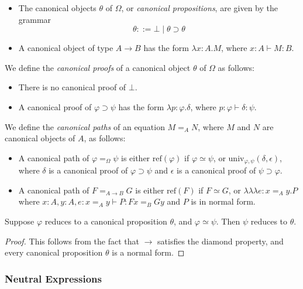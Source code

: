 \documentclass[a4paper,UKenglish]{lipics-v2016}
\newcommand*{\reff}[1]{\ensuremath{\mathrm{ref} \left( {#1} \right)}}
\newcommand*{\univ}[4]{\ensuremath{\mathrm{univ}_{{#1}, {#2}} \left({#3} , {#4} \right)}}
\newcommand*{\triplelambda}{\ensuremath{\lambda \!\! \lambda \!\! \lambda}}
\theoremstyle{plain}
\theoremstyle{definition}
\begin{document}
\begin{definition}
$ $
\begin{itemize}
\item
The canonical objects $\theta$ of $\Omega$, or \emph{canonical propositions}, are given by the grammar
\[ \theta ::= \bot \mid \theta \supset \theta \]
\item
A canonical object of type $A \rightarrow B$ has the form $\lambda x:A.M$, where
$x : A \vdash M : B$.
\end{itemize}
We define the \emph{canonical proofs} of a canonical object $\theta$ of $\Omega$ as follows:
\begin{itemize}
\item
There is no canonical proof of $\bot$.
\item
A canonical proof of $\varphi \supset \psi$ has the form $\lambda p : \varphi . \delta$, where $p : \varphi \vdash \delta : \psi$.
\end{itemize}
We define the \emph{canonical paths} of an equation $M =_A N$, where $M$ and $N$ are canonical objects of $A$, as follows:
\begin{itemize}
\item
A canonical path of $\varphi =_\Omega \psi$ is either $\reff{\varphi}$ if $\varphi \simeq \psi$, or $\univ{\varphi}{\psi}{\delta}{\epsilon}$, where $\delta$ is a canonical
proof of $\varphi \supset \psi$ and $\epsilon$ is a canonical proof of $\psi \supset \varphi$.
\item
A canonical path of $F =_{A \rightarrow B} G$ is either $\reff{F}$ if $F \simeq G$, or $\triplelambda e:x =_A y.P$ where $x : A, y : A, e : x =_A y \vdash P : Fx =_B Gy$ and $P$ is in normal form.
\end{itemize}
\end{definition}

\begin{lemma}
\label{lm:compat-beta}
Suppose $\varphi$ reduces to a canonical proposition $\theta$, and $\varphi \simeq \psi$.  Then $\psi$ reduces to $\theta$.
\end{lemma}

\begin{proof}
This follows from the fact that $\rightarrow$ satisfies the diamond property, and every canonical proposition $\theta$ is a normal form.
\end{proof}

\subsubsection{Neutral Expressions}
\end{document}
